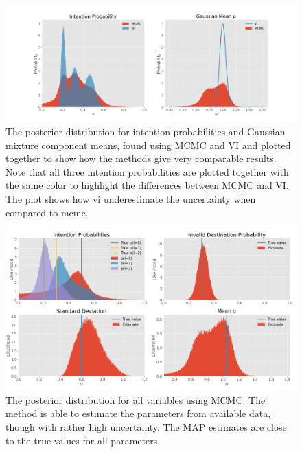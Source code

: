\begin{figure}[h]
    \centering
    \includegraphics[width=\textwidth]{figures/example_vi_mcmc_comparison.png}
    \caption{The posterior distribution for intention probabilities and Gaussian mixture component means, found using MCMC and VI and plotted together to show how the methods give very comparable results. Note that all three intention probabilities are plotted together with the same color to highlight the differences between MCMC and VI. The plot shows how \acrshort{vi} underestimate the uncertainty when compared to \acrshort{mcmc}.}
    \label{fig:example_mcmc_vi_alphas}
\end{figure}

\begin{figure}[h]
    \centering
    \includegraphics[width=\textwidth]{figures/example_mcmc.png}
    \caption{The posterior distribution for all variables using MCMC. The method is able to estimate the parameters from available data, though with rather high uncertainty. The MAP estimates are close to the true values for all parameters.}
    \label{fig:example_mcmc_posterior}
\end{figure}


